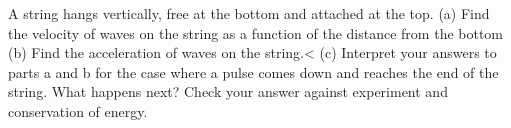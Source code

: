 A string hangs vertically, free at the bottom and attached at the top.\hwendpart
(a) Find the velocity of waves on the string as a function of the distance
from the bottom\hwendpart
(b) Find the acceleration of waves on the string.<%
(c) Interpret your answers to parts a and b for the case where a pulse comes
down and reaches the end of the string. What happens next? Check your answer
against experiment and conservation of energy.
